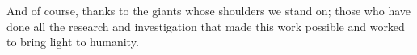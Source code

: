 \documentclass[10pt,twocolumn,letterpaper]{article}
\begin{document}
And of course, thanks to the giants whose shoulders we stand on; those who have done all the research and investigation that made this work possible and worked to bring light to humanity.


{\small


}
\end{document}

